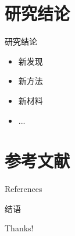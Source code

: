 \documentclass{beamer}
\begin{document}
\section{研究结论}
\begin{frame}{研究结论}
    \begin{itemize}
        \item 新发现
        \item 新方法
        \item 新材料
        \item ...
    \end{itemize}
\end{frame}

\section{参考文献}

\begin{frame}{References}%
    
    
\end{frame}

\begin{frame}{结语}
    \begin{center}
        {\Huge\calligra Thanks!}
    \end{center}
\end{frame}
\end{document}

